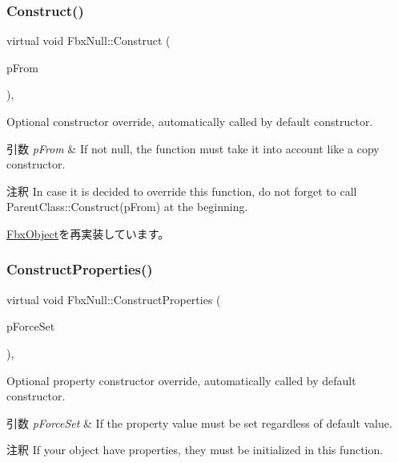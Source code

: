 \subsubsection{\texorpdfstring{Construct()}{Construct()}}
{\footnotesize\ttfamily virtual void Fbx\+Null\+::\+Construct (\begin{DoxyParamCaption}\item[{const \hyperlink{class_fbx_object}{Fbx\+Object} $\ast$}]{p\+From }\end{DoxyParamCaption})\hspace{0.3cm}{\ttfamily [protected]}, {\ttfamily [virtual]}}

Optional constructor override, automatically called by default constructor. 
\begin{DoxyParams}{引数}
{\em p\+From} & If not null, the function must take it into account like a copy constructor. \\
\hline
\end{DoxyParams}
\begin{DoxyRemark}{注釈}
In case it is decided to override this function, do not forget to call Parent\+Class\+::\+Construct(p\+From) at the beginning. 
\end{DoxyRemark}


\hyperlink{class_fbx_object_a313503bc645af3fdceb4a99ef5cea7eb}{Fbx\+Object}を再実装しています。

\mbox{\label{class_fbx_null_a5074b9c24389b6b0017e156566469421}} 
\subsubsection{\texorpdfstring{Construct\+Properties()}{ConstructProperties()}}
{\footnotesize\ttfamily virtual void Fbx\+Null\+::\+Construct\+Properties (\begin{DoxyParamCaption}\item[{bool}]{p\+Force\+Set }\end{DoxyParamCaption})\hspace{0.3cm}{\ttfamily [protected]}, {\ttfamily [virtual]}}

Optional property constructor override, automatically called by default constructor. 
\begin{DoxyParams}{引数}
{\em p\+Force\+Set} & If the property value must be set regardless of default value. \\
\hline
\end{DoxyParams}
\begin{DoxyRemark}{注釈}
If your object have properties, they must be initialized in this function. 
\end{DoxyRemark}


